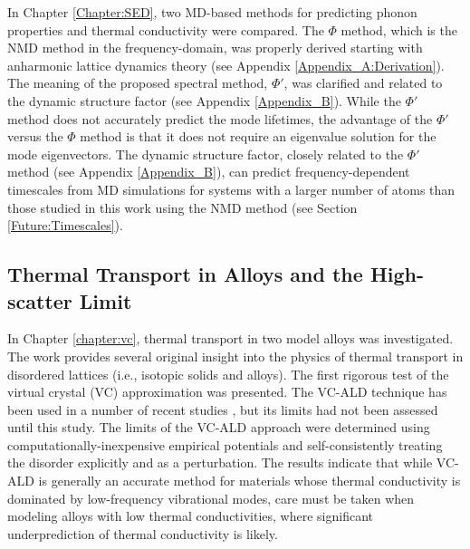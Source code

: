 In Chapter \ref{Chapter:SED}, two MD-based methods for predicting 
phonon properties and thermal conductivity were compared. 
The $\Phi$ method, which is the NMD method in the frequency-domain, 
was properly derived starting with anharmonic lattice 
dynamics theory (see Appendix \ref{Appendix_A:Derivation}). 
The meaning of the proposed spectral method, $\Phi'$, 
was clarified and related to the dynamic structure factor 
(see Appendix \ref{Appendix_B}). 
While 
the $\Phi'$ method does not accurately predict the mode lifetimes, 
the advantage of the $\Phi'$ versus the $\Phi$ method is that it does 
not require an eigenvalue solution for the mode eigenvectors.  
The dynamic structure factor, closely related to the $\Phi'$ method 
(see Appendix \ref{Appendix_B}), can predict frequency-dependent 
timescales from MD simulations for systems with a larger number of 
atoms than those studied in this work using the NMD method 
(see Section \ref{Future:Timescales}). 

\subsection{\label{Overview:VC}
Thermal Transport in Alloys and the High-scatter Limit}

In Chapter \ref{chapter:vc}, thermal transport in two model alloys 
was investigated. The work provides several original 
insight into the physics of thermal 
transport in disordered lattices (i.e., isotopic solids and alloys). 
The first rigorous test of the virtual crystal (VC) approximation 
was presented. The VC-ALD technique has been used in a number of 
recent studies 
\cite{garg_role_2011,tian_phonon_2012,lindsay_thermal_2012,
li_thermal_2012,luckyanova_coherent_2012}, 
but its limits had not been assessed until this study.  
The limits of the VC-ALD 
approach were determined using computationally-inexpensive empirical 
potentials and self-consistently treating the disorder explicitly 
and as a perturbation. 
The results indicate that while VC-ALD is generally 
an accurate method for materials 
whose thermal conductivity is dominated by low-frequency vibrational 
modes, care must be taken when modeling alloys with low thermal 
conductivities, where significant underprediction of thermal 
conductivity is likely. 


